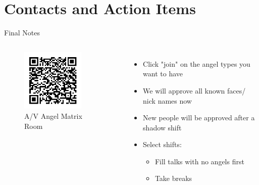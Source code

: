 \documentclass[aspectratio=169]{beamer}
\begin{document}
\section{Contacts and Action Items}
% 



\begin{frame}{Final Notes}
	\begin{columns}[T,onlytextwidth]
		\begin{figure}
			\centering
			\includegraphics[width=0.75\textwidth]{38c3-avangel-matrix.png}
			\caption{A/V Angel Matrix Room}
		\end{figure}

		\begin{itemize}
			\item Click "join" on the angel types you want to have
			\item We will approve all known faces/ nick names now
			\item New people will be approved after a shadow shift
			\item Select shifts:
			\begin{itemize}
				\item Fill talks with no angels first
				\item Take breaks
			\end{itemize}
		\end{itemize}
	\end{columns}
\end{frame}
\end{document}
